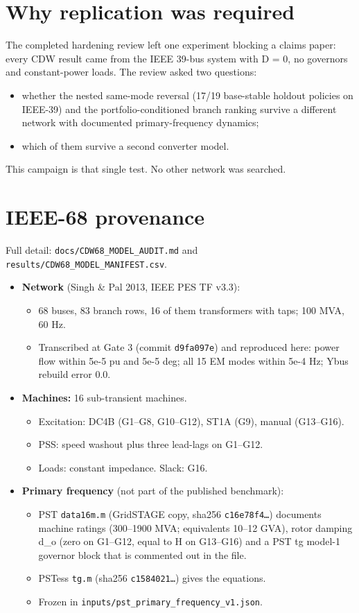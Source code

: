 \documentclass[10pt,a4paper]{article}
\begin{document}
\section{Why replication was required}
The completed hardening review left one experiment blocking a claims paper: every CDW result came from the IEEE 39-bus system with D = 0, no governors and constant-power loads. The review asked two questions:

\begin{itemize}
\item whether the nested same-mode reversal (17/19 base-stable holdout policies on IEEE-39) and the portfolio-conditioned branch ranking survive a different network with documented primary-frequency dynamics;
\item which of them survive a second converter model.
\end{itemize}
This campaign is that single test. No other network was searched.

\section{IEEE-68 provenance}
Full detail: \texttt{docs/\allowbreak{}CDW68\_\allowbreak{}MODEL\_\allowbreak{}AUDIT.md} and \texttt{results/\allowbreak{}CDW68\_\allowbreak{}MODEL\_\allowbreak{}MANIFEST.csv}.

\begin{itemize}
\item \textbf{Network} (Singh \& Pal 2013, IEEE PES TF v3.3):
\begin{itemize}
\item 68 buses, 83 branch rows, 16 of them transformers with taps; 100 MVA, 60 Hz.
\item Transcribed at Gate 3 (commit \texttt{d9fa097e}) and reproduced here: power flow within 5e-5 pu and 5e-5 deg; all 15 EM modes within 5e-4 Hz; Ybus rebuild error 0.0.
\end{itemize}
\item \textbf{Machines:} 16 sub-transient machines.
\begin{itemize}
\item Excitation: DC4B (G1–G8, G10–G12), ST1A (G9), manual (G13–G16).
\item PSS: speed washout plus three lead-lags on G1–G12.
\item Loads: constant impedance. Slack: G16.
\end{itemize}
\item \textbf{Primary frequency} (not part of the published benchmark):
\begin{itemize}
\item PST \texttt{data16m.m} (GridSTAGE copy, sha256 \texttt{c16e78f4…}) documents machine ratings (300–1900 MVA; equivalents 10–12 GVA), rotor damping d\_o (zero on G1–G12, equal to H on G13–G16) and a PST tg model-1 governor block that is commented out in the file.
\item PSTess \texttt{tg.m} (sha256 \texttt{c1584021…}) gives the equations.
\item Frozen in \texttt{inputs/\allowbreak{}pst\_\allowbreak{}primary\_\allowbreak{}frequency\_\allowbreak{}v1.json}.
\end{itemize}
\end{itemize}
\end{document}
